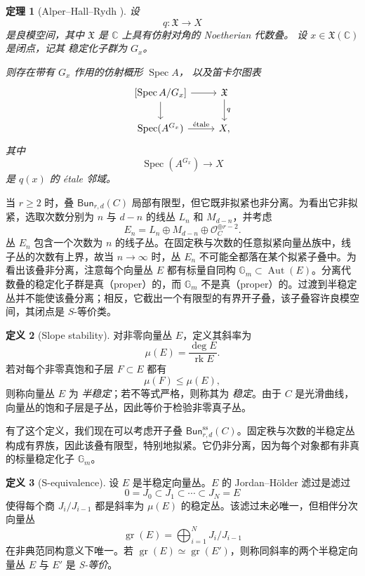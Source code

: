 \documentclass{amsart}
\newtheorem{thm}{定理}[section]
\theoremstyle{definition}
\newtheorem{defn}[thm]{定义}
\theoremstyle{remark}
\theoremstyle{plain}
\theoremstyle{definition}
\theoremstyle{remark}
\newcommand{\G}{\mathbb{G}}
\newcommand{\C}{\mathbb{C}}
\newcommand{\mc}[1]{\mathcal{#1}}
\newcommand{\mf}[1]{\mathfrak{#1}}
\newcommand{\mr}[1]{\mathrm{#1}}
\newcommand{\on}[1]{\operatorname{#1}}
\newcommand{\ms}[1]{\mathsf{#1}}
\newcommand{\1}{\mathbf{1}}
\newcommand{\2}{\mathbf{2}}
\newcommand{\3}{\mathbf{3}}
\begin{document}
\begin{thm}[Alper--Hall--Rydh {\cite{AHR2020}}]
    设
    \[
        q\colon \mf{X}\longrightarrow X
    \]
    是良模空间，其中 \(\mf{X}\) 是 \(\C\) 上具有仿射对角的 Noetherian
    代数叠。
    设 \(x\in\mf{X}(\C)\) 是闭点，记其
    稳定化子群为 \(G_x\)。

    则存在带有 \(G_x\) 作用的仿射概形 \(\on{Spec}A\)，
    以及笛卡尔图表
    \[
        \begin{tikzcd}
            {[\on{Spec}A/G_x]}
                \arrow[r]
                \arrow[d]
            & \mf{X}
                \arrow[d, "q"]
            \\
            \on{Spec}(A^{G_x})
                \arrow[r, "\mathrm{\acute{e}tale}"]
            & X,
        \end{tikzcd}
    \]
    其中
    \[
        \on{Spec}(A^{G_x})\longrightarrow X
    \]
    是 \(q(x)\) 的 \'etale 邻域。
\end{thm}

当 \(r\geq 2\) 时，叠 \(\ms{Bun}_{r,d}(C)\) 局部有限型，但它既非拟紧也非分离。为看出它非拟紧，选取次数分别为 \(n\) 与 \(d-n\) 的线丛 \(L_n\) 和 \(M_{d-n}\)，并考虑
\[
    E_n=L_n\oplus M_{d-n}\oplus\mc{O}_C^{\oplus r-2}.
\]
丛 \(E_n\) 包含一个次数为 \(n\) 的线子丛。在固定秩与次数的任意拟紧向量丛族中，线子丛的次数有上界，故当 \(n\to\infty\) 时，丛 \(E_n\) 不可能全都落在某个拟紧子叠中。为看出该叠非分离，注意每个向量丛 \(E\) 都有标量自同构 \(\G_m\subset\on{Aut}(E)\)。分离代数叠的稳定化子群是真（proper）的，而 \(\G_m\) 不是真（proper）的。过渡到半稳定丛并不能使该叠分离；相反，它截出一个有限型的有界开子叠，该子叠容许良模空间，其闭点是 \(S\)-等价类。

\begin{defn}[Slope stability]
    对非零向量丛 \(E\)，定义其斜率为
    \[ \mu(E)=\frac{\deg E}{\on{rk}E}. \]
    若对每个非零真饱和子层 \(F\subset E\) 都有
    \[ \mu(F)\leq\mu(E), \]
    则称向量丛 \(E\) 为 \textit{半稳定}；若不等式严格，则称其为 \textit{稳定}。由于 \(C\) 是光滑曲线，向量丛的饱和子层是子丛，因此等价于检验非零真子丛。
\end{defn}

有了这个定义，我们现在可以考虑开子叠 \(\ms{Bun}_{r,d}^{\mr{ss}}(C)\)。固定秩与次数的半稳定丛构成有界族，因此该叠有限型，特别地拟紧。它仍非分离，因为每个对象都有非真的标量稳定化子 \(\G_m\)。

\begin{defn}[S-equivalence]
    设 \(E\) 是半稳定向量丛。\(E\) 的 Jordan--H\"older 滤过是滤过
    \[ 0=J_0\subset J_1\subset\cdots\subset J_N=E \]
    使得每个商 \(J_i/J_{i-1}\) 都是斜率为 \(\mu(E)\) 的稳定丛。该滤过未必唯一，但相伴分次向量丛
    \[
        \on{gr}(E)=\bigoplus_{i=1}^N J_i/J_{i-1}
    \]
    在非典范同构意义下唯一。若 \(\on{gr}(E)\simeq\on{gr}(E')\)，则称同斜率的两个半稳定向量丛 \(E\) 与 \(E'\) 是 \textit{S-等价}。
\end{defn}
\end{document}
